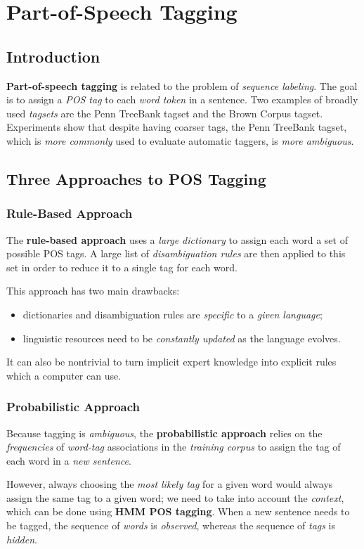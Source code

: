 \section{Part-of-Speech Tagging}
\subsection{Introduction}
\textbf{Part-of-speech tagging} is related to the problem of \emph{sequence labeling}.
The goal is to assign a \emph{POS tag} to each \emph{word token} in a sentence.
Two examples of broadly used \emph{tagsets} are the Penn TreeBank tagset and the Brown Corpus tagset.
Experiments show that despite having coarser tags, the Penn TreeBank tagset, which is \emph{more commonly} used to evaluate automatic taggers, is \emph{more ambiguous}.

\subsection{Three Approaches to POS Tagging}
\subsubsection{Rule-Based Approach}
The \textbf{rule-based approach} uses a \emph{large dictionary} to assign each word a set of possible POS tags.
A large list of \emph{disambiguation rules} are then applied to this set in order to reduce it to a single tag for each word.

This approach has two main drawbacks:
\begin{itemize}
	\item dictionaries and disambiguation rules are \emph{specific} to a \emph{given language};
	\item linguistic resources need to be \emph{constantly updated} as the language evolves.
\end{itemize}
It can also be nontrivial to turn implicit expert knowledge into explicit rules which a computer can use.

\subsubsection{Probabilistic Approach}
Because tagging is \emph{ambiguous}, the \textbf{probabilistic approach} relies on the \emph{frequencies} of \emph{word-tag} associations in the \emph{training corpus} to assign the tag of each word in a \emph{new sentence}.

However, always choosing the \emph{most likely tag} for a given word would always assign the same tag to a given word; we need to take into account the \emph{context}, which can be done using \textbf{HMM POS tagging}.
When a new sentence needs to be tagged, the sequence of \emph{words} is \emph{observed}, whereas the sequence of \emph{tags} is \emph{hidden}.

